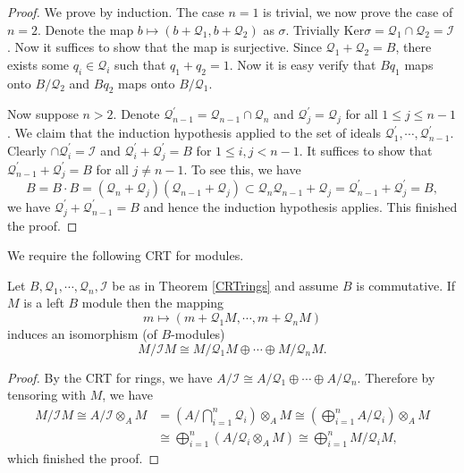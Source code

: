 \begin{proof}
We prove by induction. The case $n=1$ is trivial, we now prove the case of $n=2$. Denote the map $b\mapsto(b+\mathcal{Q}_1,b+\mathcal{Q}_2)$ as $\sigma$. Trivially $\mathrm{Ker}\sigma=\mathcal{Q}_1\cap\mathcal{Q}_2=\mathcal{I}$. Now it suffices to show that the map is surjective. Since $\mathcal{Q}_1+\mathcal{Q}_2=B$, there exists some $q_i\in\mathcal{Q}_i$ such that $q_1+q_2=1$. Now it is easy verify that $Bq_1$ maps onto $B/\mathcal{Q}_2$ and $Bq_2$ maps onto $B/\mathcal{Q}_1$.\par
Now suppose $n>2$. Denote $\mathcal{Q}_{n-1}^\prime=\mathcal{Q}_{n-1}\cap\mathcal{Q}_n$ and $\mathcal{Q}_j^\prime=\mathcal{Q}_j$ for all $1\le j\le n-1$. We claim that the induction hypothesis applied to the set of ideals $\mathcal{Q}_1^\prime,\cdots,\mathcal{Q}_{n-1}^\prime$. Clearly $\cap\mathcal{Q}_i^\prime=\mathcal{I}$ and $\mathcal{Q}_i^\prime+\mathcal{Q}_j^\prime=B$ for $1\le i,j<n-1$. It suffices to show that $\mathcal{Q}_{n-1}^\prime+\mathcal{Q}_j^\prime=B$ for all $j\ne n-1$. To see this, we have 
$$
B=B\cdot B=\left( \mathcal{Q} _n+\mathcal{Q} _j \right) \left( \mathcal{Q} _{n-1}+\mathcal{Q} _j \right) \subset \mathcal{Q} _n\mathcal{Q} _{n-1}+\mathcal{Q} _j=\mathcal{Q} _{n-1}^{\prime}+\mathcal{Q} _{j}^{\prime}=B,
$$
we have $\mathcal{Q}_j^\prime+\mathcal{Q}_{n-1}^\prime=B$ and hence the induction hypothesis applies. This finished the proof.
\end{proof}
We require the following CRT for modules.
\begin{theorem}
Let $B,\mathcal{Q}_1,\cdots,\mathcal{Q}_n,\mathcal{I}$ be as in Theorem \ref{CRTrings} and assume $B$ is commutative. If $M$ is a left $B$ module then the mapping 
$$m\mapsto \left( m+\mathcal{Q} _1M,\cdots ,m+\mathcal{Q} _nM \right) $$
induces an isomorphism (of $B$-modules) 
$$M/\mathcal{I} M\cong M/\mathcal{Q} _1M\oplus \cdots \oplus M/\mathcal{Q} _nM.$$
\end{theorem}
\begin{proof}
By the CRT for rings, we have $A/\mathcal{I}\cong A/\mathcal{Q}_1\oplus\cdots\oplus A/\mathcal{Q}_n$. Therefore by tensoring with $M$, we have 
$$
\begin{aligned}
M/\mathcal{I} M\cong A/\mathcal{I} \otimes _AM&=\left( A/\bigcap_{i=1}^n{\mathcal{Q} _i} \right) \otimes _AM\cong \left( \bigoplus_{i=1}^n{A/\mathcal{Q} _i} \right) \otimes _AM
\\
&\cong \bigoplus_{i=1}^n{\left( A/\mathcal{Q} _i\otimes _AM \right)}\cong \bigoplus_{i=1}^n{M/\mathcal{Q} _iM},
\end{aligned}
$$
which finished the proof.
\end{proof}
